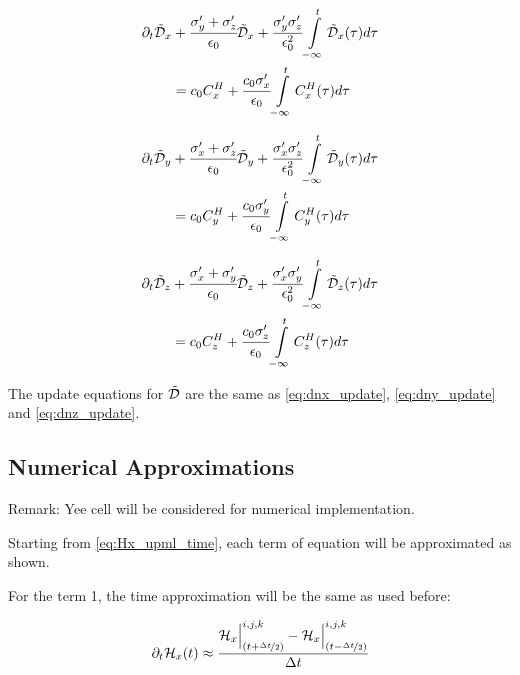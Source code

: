 \begin{align}
    \partial_t\tilde{\mathcal{D}}_x
    &+
    \cfrac{\sigma_y^{\prime} + \sigma_z^{\prime}}{\epsilon_0}\tilde{\mathcal{D}}_x
    +
    \cfrac{\sigma_y^{\prime} \sigma_z^{\prime}}{\epsilon_0^2} \int\limits_{-\infty}^t\tilde{\mathcal{D}}_x(\tau)d\tau 
    \nonumber \\
    &=
    c_0C_x^H
    +
    \cfrac{c_0\sigma_x^{\prime}}{\epsilon_0}\int\limits_{-\infty}^tC_x^H(\tau)d\tau
    \label{eq:Dx_upml_time}
\end{align}

\begin{align}
    \partial_t\tilde{\mathcal{D}}_y
    &+
    \cfrac{\sigma_x^{\prime} + \sigma_z^{\prime}}{\epsilon_0}\tilde{\mathcal{D}}_y
    +
    \cfrac{\sigma_x^{\prime} \sigma_z^{\prime}}{\epsilon_0^2} \int\limits_{-\infty}^t\tilde{\mathcal{D}}_y(\tau)d\tau 
    \nonumber \\
    &=
    c_0C_y^H
    +
    \cfrac{c_0\sigma_y^{\prime}}{\epsilon_0}\int\limits_{-\infty}^tC_y^H(\tau)d\tau
    \label{eq:Dy_upml_time}
\end{align}

\begin{align}
    \partial_t\tilde{\mathcal{D}}_z
    &+
    \cfrac{\sigma_x^{\prime} + \sigma_y^{\prime}}{\epsilon_0}\tilde{\mathcal{D}}_z
    +
    \cfrac{\sigma_x^{\prime} \sigma_y^{\prime}}{\epsilon_0^2} \int\limits_{-\infty}^t\tilde{\mathcal{D}}_z(\tau)d\tau 
    \nonumber \\
    &=
    c_0C_z^H
    +
    \cfrac{c_0\sigma_z^{\prime}}{\epsilon_0}\int\limits_{-\infty}^tC_z^H(\tau)d\tau
    \label{eq:Dz_upml_time}
\end{align}

The update equations for $\tilde{\mathcal{D}}$ are the same as \eqref{eq:dnx_update}, \eqref{eq:dny_update} and \eqref{eq:dnz_update}.

\subsection{Numerical Approximations}

Remark: Yee cell will be considered for numerical implementation.

Starting from \eqref{eq:Hx_upml_time}, each term of equation will be approximated as shown.

For the term 1, the time approximation will be the same as used before:

\begin{align}
    \partial_t\mathcal{H}_x(t) \approx \cfrac{\mathcal{H}_x\Big|_{(t+\nicefrac{\Delta t}{2})}^{i,j,k}-\mathcal{H}_x\Big|^{i,j,k}_{(t-\nicefrac{\Delta t}{2})}}{\Delta t}
\end{align}


